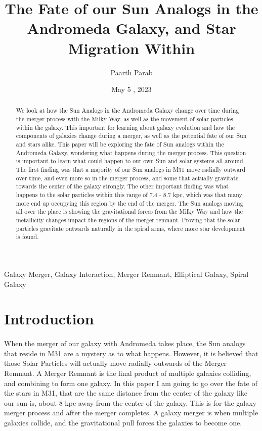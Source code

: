 \documentclass[fleqn,usenatbib]{mnras}
\title[Short title, max. 45 characters]{The Fate of our Sun Analogs in the Andromeda Galaxy, and Star Migration Within}
\author[Paarth Parab et al.]{
Paarth Parab
\\
}
\date{May 5 , 2023}
\begin{document}
\label{firstpage}
\pagerange{\pageref{firstpage}--\pageref{lastpage}}
\maketitle

\begin{abstract}
We look at how the Sun Analogs in the Andromeda Galaxy change over time during the merger process with the Milky Way, as well as the movement of solar particles within the galaxy. This important for learning about galaxy evolution and how the components of galaxies change during a merger, as well as the potential fate of our Sun and stars alike. This paper will be exploring the fate of Sun analogs within the Andromeda Galaxy, wondering what happens during the merger process. This question is important to learn what could happen to our own Sun and solar systems all around. The first finding was that a majority of our Sun analogs in M31 move radially outward over time, and even more so in the merger process, and some that actually gravitate towards the center of the galaxy strongly. The other important finding was what happens to the solar particles within this range of 7.4 - 8.7 kpc, which was that many more end up occupying this region by the end of the merger. The Sun analogs moving all over the place is showing the gravitational forces from the Milky Way and how the metallicity changes impact the regions of the merger remnant. Proving that the solar particles gravitate outwards naturally in the spiral arms, where more star development is found.
\end{abstract}

\begin{keywords}
Galaxy Merger, 
Galaxy Interaction,  
Merger Remnant, 
Elliptical Galaxy,
Spiral Galaxy
\end{keywords}

\section{Introduction}

\paragraph{}
When the merger of our galaxy with Andromeda takes place, the Sun analogs that reside in M31 are a mystery as to what happens. However, it is believed that those Solar Particles will actually move radially outwards of the Merger Remnant. A Merger Remnant is the final product of multiple galaxies colliding, and combining to form one galaxy. In this paper I am going to go over the fate of the stars in M31, that are the same distance from the center of the galaxy like our sun is, about 8 kpc away from the center of the galaxy. This is for the galaxy merger process and after the merger completes. A galaxy merger is when multiple galaxies collide, and the gravitational pull forces the galaxies to become one. 
\end{document}

